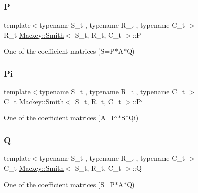 \subsubsection{\texorpdfstring{P}{P}}
{\footnotesize\ttfamily template$<$typename S\+\_\+t , typename R\+\_\+t , typename C\+\_\+t $>$ \\
R\+\_\+t \hyperlink{classMackey_1_1Smith}{Mackey\+::\+Smith}$<$ S\+\_\+t, R\+\_\+t, C\+\_\+t $>$\+::P}



One of the coefficient matrices (S=P$\ast$\+A$\ast$Q) 

\mbox{\label{classMackey_1_1Smith_a890f70fcd15554ee0c3b8469ffb55fde}} 
\subsubsection{\texorpdfstring{Pi}{Pi}}
{\footnotesize\ttfamily template$<$typename S\+\_\+t , typename R\+\_\+t , typename C\+\_\+t $>$ \\
C\+\_\+t \hyperlink{classMackey_1_1Smith}{Mackey\+::\+Smith}$<$ S\+\_\+t, R\+\_\+t, C\+\_\+t $>$\+::Pi}



One of the coefficient matrices (A=Pi$\ast$\+S$\ast$\+Qi) 

\mbox{\label{classMackey_1_1Smith_aba53f81430955d8cf7f7ce4677486214}} 
\subsubsection{\texorpdfstring{Q}{Q}}
{\footnotesize\ttfamily template$<$typename S\+\_\+t , typename R\+\_\+t , typename C\+\_\+t $>$ \\
C\+\_\+t \hyperlink{classMackey_1_1Smith}{Mackey\+::\+Smith}$<$ S\+\_\+t, R\+\_\+t, C\+\_\+t $>$\+::Q}



One of the coefficient matrices (S=P$\ast$\+A$\ast$Q) 

\mbox{\label{classMackey_1_1Smith_a8446d6e35feabbdc233e2a15efde4930}} 
